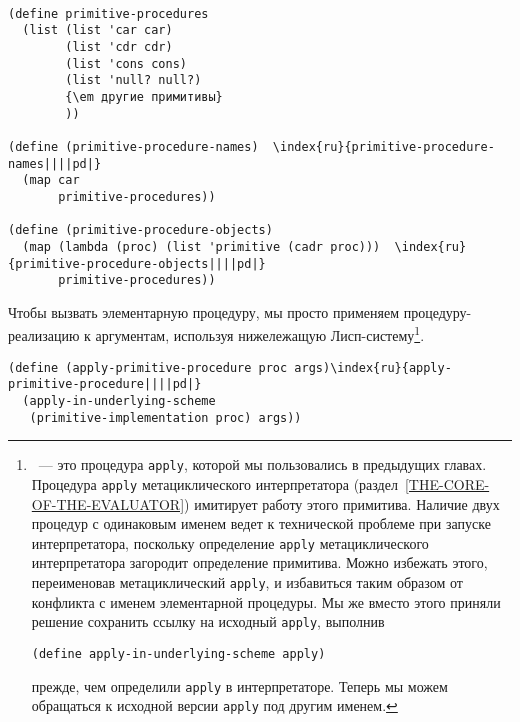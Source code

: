 \begin{Verbatim}[fontsize=\small]

(define primitive-procedures
  (list (list 'car car)
        (list 'cdr cdr)
        (list 'cons cons)
        (list 'null? null?)
        {\em другие примитивы}
        ))

(define (primitive-procedure-names)  \index{ru}{primitive-procedure-names||||pd|}
  (map car
       primitive-procedures)) 

(define (primitive-procedure-objects)
  (map (lambda (proc) (list 'primitive (cadr proc)))  \index{ru}{primitive-procedure-objects||||pd|}
       primitive-procedures))
\end{Verbatim}

Чтобы вызвать элементарную процедуру, мы просто применяем
про\-це\-ду\-ру-реализацию к аргументам, используя нижележащую
Лисп-систему\footnote{~--- это
процедура {\tt apply}, которой мы пользовались в предыдущих
главах.  Процедура {\tt apply} метациклического интерпретатора
(раздел~\ref{THE-CORE-OF-THE-EVALUATOR}) имитирует работу
этого примитива.  Наличие двух процедур с одинаковым
именем ведет к технической проблеме при запуске интерпретатора,
поскольку определение {\tt apply} метациклического
интерпретатора загородит определение примитива.  Можно избежать этого,
переименовав метациклический {\tt apply}, и избавиться таким образом от
конфликта с именем элементарной процедуры.  Мы же вместо этого приняли решение
сохранить ссылку на исходный {\tt apply}, выполнив

\begin{Verbatim}
(define apply-in-underlying-scheme apply)
\end{Verbatim}
прежде, чем определили {\tt apply} в интерпретаторе. Теперь мы
можем обращаться к исходной версии {\tt apply} под другим
именем.}.

\begin{Verbatim}[fontsize=\small]
(define (apply-primitive-procedure proc args)\index{ru}{apply-primitive-procedure||||pd|}
  (apply-in-underlying-scheme
   (primitive-implementation proc) args))
\end{Verbatim}

